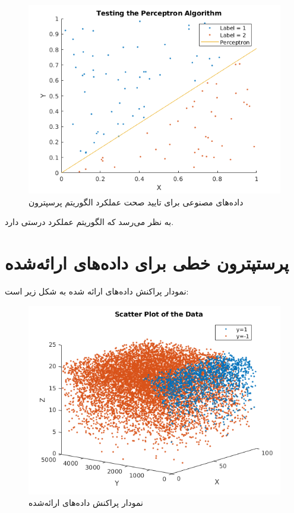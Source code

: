 \documentclass[a4paper]{article}
\begin{document}
\begin{figure}[h!]
\centering
\includegraphics[scale=0.5]{perc.png}
\caption{داده‌های مصنوعی برای تایید صحت عملکرد الگوریتم پرسپترون}
\end{figure}
به نظر می‌رسد که الگوریتم عملکرد درستی دارد.
\section{پرستپترون خطی برای داده‌های ارائه‌شده}
نمودار پراکنش داده‌های ارائه شده به شکل زیر است:
\begin{figure}[h!]
	\centering
	\includegraphics[scale=0.5]{scatter.png}
	\caption{نمودار پراکنش داده‌های ارائه‌شده}
\end{figure}
\end{document}
